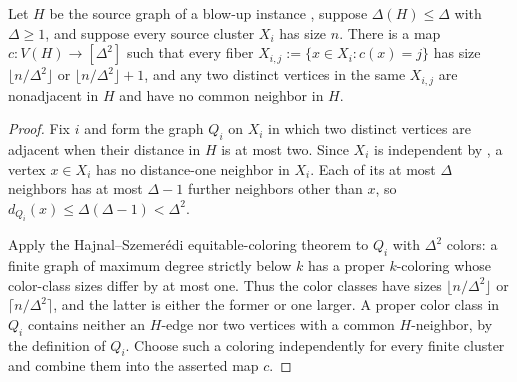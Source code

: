 \begin{lemma}
Let $H$ be the source graph of a blow-up instance , suppose $\Delta(H)\leq\Delta$ with $\Delta\geq1$, and suppose every source cluster $X_i$ has size $n$.  There is a map $c:V(H)\to[\Delta^2]$ such that every fiber $X_{i,j}:=\{x\in X_i:c(x)=j\}$ has size $\lfloor n/\Delta^2\rfloor$ or $\lfloor n/\Delta^2\rfloor+1$, and any two distinct vertices in the same $X_{i,j}$ are nonadjacent in $H$ and have no common neighbor in $H$.
\end{lemma}
\begin{proof}
Fix $i$ and form the graph $Q_i$ on $X_i$ in which two distinct vertices are adjacent when their distance in $H$ is at most two.  Since $X_i$ is independent by , a vertex $x\in X_i$ has no distance-one neighbor in $X_i$.  Each of its at most $\Delta$ neighbors has at most $\Delta-1$ further neighbors other than $x$, so $d_{Q_i}(x)\leq\Delta(\Delta-1)<\Delta^2$.

Apply the Hajnal--Szemer\'edi equitable-coloring theorem to $Q_i$ with $\Delta^2$ colors: a finite graph of maximum degree strictly below $k$ has a proper $k$-coloring whose color-class sizes differ by at most one.  Thus the color classes have sizes $\lfloor n/\Delta^2\rfloor$ or $\lceil n/\Delta^2\rceil$, and the latter is either the former or one larger.  A proper color class in $Q_i$ contains neither an $H$-edge nor two vertices with a common $H$-neighbor, by the definition of $Q_i$.  Choose such a coloring independently for every finite cluster and combine them into the asserted map $c$.
\end{proof}
